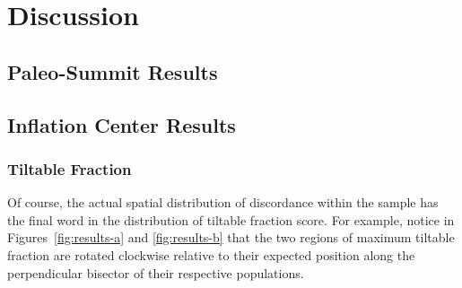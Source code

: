 \chapter{Discussion}\label{cha:discussion}

\section{Paleo-Summit Results}

\section{Inflation Center Results}

\subsection{Tiltable Fraction}\label{sec:tiltable-fraction}


Of course, the actual spatial distribution of discordance within the sample has the final word in the distribution of tiltable fraction score. For example, notice in Figures~\ref{fig:results-a} and \ref{fig:results-b} that the two regions of maximum tiltable fraction are rotated clockwise relative to their expected position along the perpendicular bisector of their respective populations.

